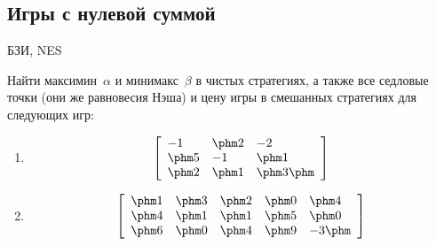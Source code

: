 \subsection{Игры с нулевой суммой}

\begin{problem}
\begin{source}
БЗИ, NES
\end{source} Найти
максимин~$\alpha$ и минимакс~$\beta$ в чистых стратегиях, а
также все седловые точки (они же равновесия Нэша) и цену
игры в смешанных стратегиях для следующих игр:

\begin{enumerate}

\item \[\left[\begin{array}{lll} -1&\phm 2&-2\\ \phm 5&-1&\phm 1\\
\phm 2&\phm 1&\phm 3\phm \\
\end{array}\right]\]

\bigskip

\item \[\left[\begin{array}{lllll} \phm 1&\phm 3&\phm 2&\phm 0&\phm 4\\
\phm 4&\phm 1&\phm 1&\phm 5&\phm 0\\ \phm 6&\phm 0&\phm
4&\phm
9&-3\phm \\
\end{array}\right]\]

\end{enumerate}

\begin{sol}

\end{sol}
\end{problem}




